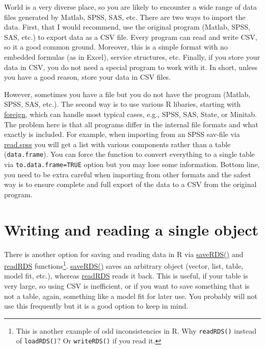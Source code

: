 \documentclass[
]{book}
\begin{document}
World is a very diverse place, so you are likely to encounter a wide range of data files generated by Matlab, SPSS, SAS, etc. There are two ways to import the data. First, that I would recommend, use the original program (Matlab, SPSS, SAS, etc.) to export data as a CSV file. Every program can read and write CSV, so it a good common ground. Moreover, this is a simple format with no embedded formulas (as in Excel), service structures, etc. Finally, if you store your data in CSV, you do not need a special program to work with it. In short, unless you have a good reason, store your data in CSV files.

However, sometimes you have a file but you do not have the program (Matlab, SPSS, SAS, etc.). The second way is to use various R libaries, starting with \href{https://www.rdocumentation.org/packages/foreign}{foreign}, which can handle most typical cases, e.g., SPSS, SAS, State, or Minitab. The problem here is that all programs differ in the internal file formats and what exactly is included. For example, when importing from an SPSS sav-file via \href{https://www.rdocumentation.org/packages/foreign/versions/0.8-80/topics/read.spss}{read.spss} you will get a list with various components rather than a table (\texttt{data.frame}). You can force the function to convert everything to a single table via \texttt{to.data.frame=TRUE} option but you may lose some information. Bottom line, you need to be extra careful when importing from other formats and the safest way is to ensure complete and full export of the data to a CSV from the original program.

\hypertarget{rds}{%
\section{Writing and reading a single object}\label{rds}}

There is another option for saving and reading data in R via \href{https://stat.ethz.ch/R-manual/R-devel/library/base/html/readRDS.html}{saveRDS()} and \href{https://stat.ethz.ch/R-manual/R-devel/library/base/html/readRDS.html}{readRDS} functions\footnote{This is another example of odd inconsistencies in R. Why \texttt{readRDS()} instead of \texttt{loadRDS()}? Or \texttt{writeRDS()} if you read it.}. \href{https://stat.ethz.ch/R-manual/R-devel/library/base/html/readRDS.html}{saveRDS()} saves an arbitrary object (vector, list, table, model fit, etc.), whereas \href{https://stat.ethz.ch/R-manual/R-devel/library/base/html/readRDS.html}{readRDS} reads it back. This is useful, if your table is very large, so using CSV is inefficient, or if you want to save something that is not a table, again, something like a model fit for later use. You probably will not use this frequently but it is a good option to keep in mind.
\end{document}
